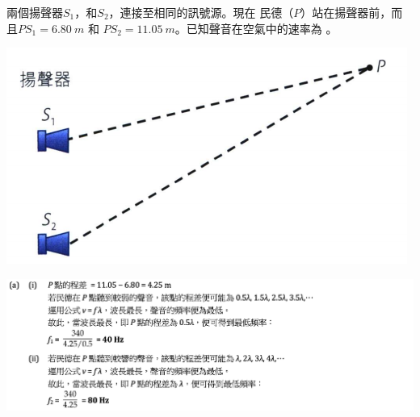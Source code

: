 {
    兩個揚聲器$S_1$，和$S_2$，連接至相同的訊號源。現在 民德（$P$）站在揚聲器前，而且$PS_1=\qty{6.80}{m}$ 和 $PS_2= \qty{11.05}{m} $。已知聲音在空氣中的速率為 。
    \par{\par\centering\includegraphics[width=.4\textwidth]{./img/ch3_earlyclass_wave_lq_2024-05-14-11-48-54.png}\par}
}{
    \sol\par{\par\centering\includegraphics[width=\textwidth]{./img/ch3_earlyclass_wave_lq_2024-05-14-11-50-40.png}\par}
}


